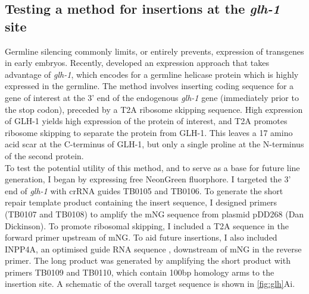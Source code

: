 \documentclass[12pt]{"report"}
\begin{document}
\subsection{Testing a method for insertions at the \textit{glh-1} site}

Germline silencing commonly limits, or entirely prevents, expression of transgenes in early embryos. Recently, \textcite{Goudeau2021} developed an expression approach that takes advantage of \textit{glh-1}, which encodes for a germline helicase protein which is highly expressed in the germline. The method involves inserting coding sequence for a gene of interest at the 3' end of the endogenous \textit{glh-1} gene (immediately prior to the stop codon), preceded by a T2A ribosome skipping sequence. High expression of GLH-1 yields high expression of the protein of interest, and T2A promotes ribosome skipping to separate the protein from GLH-1. This leaves a 17 amino acid scar at the C-terminus of GLH-1, but only a single proline at the N-terminus of the second protein.\\

To test the potential utility of this method, and to serve as a base for future line generation, I began by expressing free NeonGreen fluorphore. I targeted the 3' end of \textit{glh-1} with crRNA guides TB0105 and TB0106. To generate the short repair template product containing the insert sequence, I designed primers (TB0107 and TB0108) to amplify the mNG sequence from plasmid pDD268 (Dan Dickinson). To promote ribosomal skipping, I included a T2A sequence in the forward primer upstream of mNG. To aid future insertions, I also included INPP4A, an optimised guide RNA sequence \citep{Duan2020}, downstream of mNG in the reverse primer. The long product was generated by amplifying the short product with primers TB0109 and TB0110, which contain 100bp homology arms to the insertion site. A schematic of the overall target sequence is shown in \cref{fig:glh}Ai.\\
\end{document}

